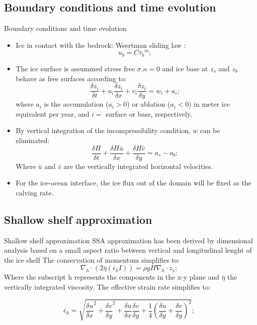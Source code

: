 \documentclass[11pt]{beamer}
\begin{document}
	\subsection{Boundary conditions and time evolution}
		\begin{frame}[allowframebreaks]{Boundary conditions and time evolution}
		\justifying
			\begin{itemize}
				\item Ice in contact with the bedrock: Weertman sliding law \cite[]{weertman1974stability}:
				\begin{equation}
					u_b=C{\tau_b}^m;
				\end{equation}
				\item The ice surface is assummed stress free $\sigma .n=0$ and ice base at $z_s$ and $z_b$ behave as free surfaces according to:
				\begin{equation}
					\frac{\delta z_{i}}{\delta t}+u_{i}\frac{\delta z_{i}}{\delta x}+v_{i}\frac{\delta z_{i}}{\delta y}=w_{i}+a_{i};
				\end{equation}
			where $a_{i}$ is the accumulation ($a_{i}>0$) or ablation ($a_{i}<0$) in meter ice equivalent per year, and $i=$ surface or base, respectively.
			\item By vertical integration of the incompressibility condition, $w$ can be eliminated:
			\begin{equation}
				\frac{\delta H}{\delta t}+\frac{\delta H\bar{u}}{\delta x}+\frac{\delta H \bar{v}}{\delta y}=a_s-a_b ;
			\end{equation}
			Where $\bar{u}$ and $\bar{v}$ are the vertically integrated horizontal velocities. 
			\item For the ice-ocean interface, the ice flux out of the domain will be fixed as the calving rate.
			\end{itemize}
		\end{frame}

	\subsection{Shallow shelf approximation}
		\begin{frame}{Shallow shelf approximation}
			\justifying
			SSA approximation has been derived by dimensional analysis based on a small aspect ratio between vertical and longitudinal lenght of the ice shelf
			The conservation of momentum simplifies to:
			\begin{equation}
				\nabla_h \cdot(2\bar{\eta}(\dot{\epsilon_h}I))=\rho g H \nabla_h \cdot z_s;
			\end{equation}
			Where the subscript h represents the components in the x-y plane and $\bar{\eta}$ the vertically integrated viscosity. The effective strain rate simplifies to:
			
			\begin{equation}
				\dot{\epsilon_h}=\sqrt{{\frac{\delta u}{\delta x}}^2+{\frac{\delta v}{\delta y}}^2+\frac{\delta u}{\delta x}\frac{\delta v}{\delta y}+\frac{1}{4}{(\frac{\delta u}{\delta y}+\frac{\delta v}{\delta y})}^2};
			\end{equation}

		\end{frame}
			
\end{document}
